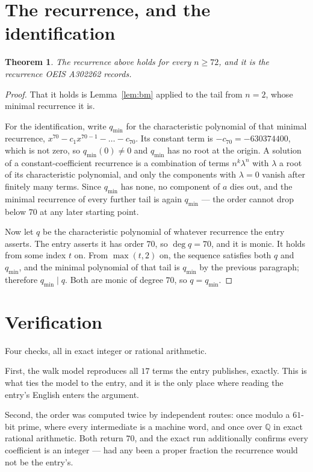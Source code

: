 \documentclass[11pt,a4paper]{article}
\theoremstyle{plain}
\newtheorem{theorem}{Theorem}
\theoremstyle{definition}
\begin{document}
\section{The recurrence, and the identification}

\begin{theorem}
The recurrence above holds for every $n\ge72$, and it is the recurrence OEIS A302262 records.
\end{theorem}

\begin{proof}
That it holds is Lemma~\ref{lem:bm} applied to the tail from $n=2$, whose minimal
recurrence it is.

For the identification, write $q_{\min}$ for the characteristic polynomial of that minimal
recurrence, $x^{70}-c_1x^{70-1}-\dots-c_{70}$. Its constant term is
$-c_{70}=-630374400$, which is not zero, so $q_{\min}(0)\neq0$ and $q_{\min}$ has no
root at the origin. A solution of a constant-coefficient recurrence is a combination of terms
$n^{k}\lambda^{n}$ with $\lambda$ a root of its characteristic polynomial, and only the
components with $\lambda=0$ vanish after finitely many terms. Since $q_{\min}$ has none, no
component of $a$ dies out, and the minimal recurrence of every further tail is again
$q_{\min}$ --- the order cannot drop below $70$ at any later starting point.

Now let $q$ be the characteristic polynomial of whatever recurrence the entry asserts. The
entry asserts it has order $70$, so $\deg q=70$, and it is monic. It holds from some
index $t$ on. From $\max(t,2)$ on, the sequence satisfies both $q$ and $q_{\min}$, and
the minimal polynomial of that tail is $q_{\min}$ by the previous paragraph; therefore
$q_{\min}\mid q$. Both are monic of degree $70$, so $q=q_{\min}$.
\end{proof}

\section{Verification}

Four checks, all in exact integer or rational arithmetic.

First, the walk model reproduces all $17$ terms the entry publishes, exactly. This is
what ties the model to the entry, and it is the only place where reading the entry's English
enters the argument.

Second, the order was computed twice by independent routes: once modulo a $61$-bit prime, where
every intermediate is a machine word, and once over $\mathbb{Q}$ in exact rational arithmetic.
Both return $70$, and the exact run additionally confirms every coefficient is an integer
--- had any been a proper fraction the recurrence would not be the entry's.
\end{document}
